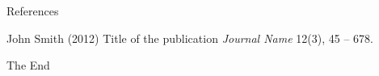 \documentclass[aspectratio=169,xcolor=dvipsnames]{beamer}
\begin{document}

\begin{frame}{References}
    \footnotesize{
        \begin{thebibliography}{99}
             John Smith (2012)
            \newblock Title of the publication
            \newblock \emph{Journal Name} 12(3), 45 -- 678.
        \end{thebibliography}
    }
\end{frame}


\begin{frame}
    \Huge{\centerline{The End}}
\end{frame}

\end{document}

